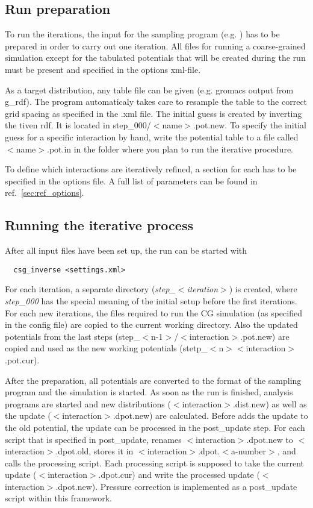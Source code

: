 \subsection{Run preparation}
To run the iterations, the input for the sampling program (e.g. \gromacs ) has to be prepared in order to carry out one iteration. All files for running a coarse-grained simulation except for the tabulated potentials that will be created during the run must be present and specified in the options xml-file.

As a target distribution, any table file can be given (e.g. gromacs output from g\_rdf). The program automaticaly takes care to resample the table to the correct grid spacing as specified in the .xml file.
The initial guess is created by inverting the tiven rdf. It is located in step\_000/$<$name$>$.pot.new. To specify the initial guess for a specific interaction by hand, write the potential table to a file called $<$name$>$.pot.in in the folder where you plan to run the iterative procedure.

To define which interactions are iteratively refined, a section for each has to be specified in the options file. A full list of parameters can be found in ref.~\ref{sec:ref_options}.

\subsection{Running the iterative process}
After all input files have been set up, the run can be started with
\begin{verbatim}
  csg_inverse <settings.xml>
\end{verbatim}

For each iteration, a separate directory (\textit{step\_$<$iteration$>$}) is created, where \textit{step\_000} has the special meaning of the initial setup before the first iterations. For each new iterations, the files required to run the CG simulation (as specified in the config file) are copied to the current working directory. Also the updated potentials from the last steps (step\_$<$n-1$>$/$<$interaction$>$.pot.new) are copied and used as the new working potentials (stetp\_$<$n$>$\/$<$interaction$>$.pot.cur).

After the preparation, all potentials are converted to the format of the sampling program and the simulation is started. As soon as the run is finished, analysis programs are started and new distributions ($<$interaction$>$.dist.new) as well as the update ($<$interaction$>$.dpot.new) are calculated. Before \votca adds the update to the old potential, the update can be processed in the post\_update step. For each script that is specified in post\_update, \votca renames $<$interaction$>$.dpot.new to $<$interaction$>$.dpot.old, stores it in $<$interaction$>$.dpot.$<$a-number$>$, and calls the processing script. Each processing script is supposed to take the current update ($<$interaction$>$.dpot.cur) and write the processed update ($<$interaction$>$.dpot.new). Pressure correction is implemented as a post\_update script within this framework.

